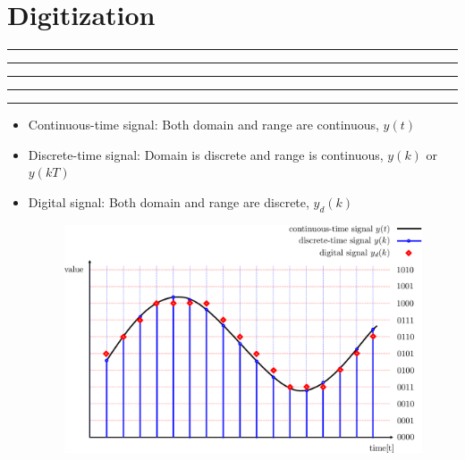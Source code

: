 \setcounter{chapter}{7}
\setcounter{section}{0}
\section{Digitization}
\vspace{-8pt} \hrule \hrule \hrule \hrule \hrule  \vspace{12pt}
 \begin{itemize}
  \item Continuous-time signal: Both domain and range are continuous, $y(t)$

  \item Discrete-time signal: Domain is discrete and range is continuous, $y(k)$ or $y(kT)$

  \item Digital signal: Both domain and range are discrete, $y_d(k)$
    \begin{figure}[!hb]
        \centering
        \includegraphics[width=20cm]{./FIG_Franklin/fig8-smc1.png}
    \end{figure}
 \end{itemize} 